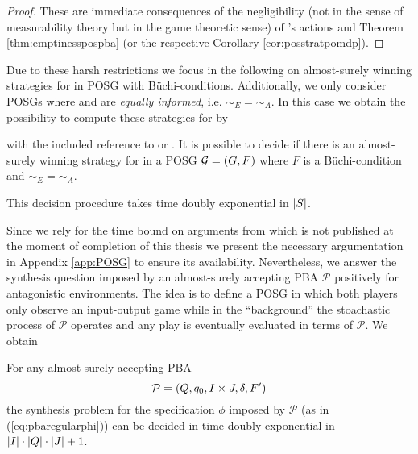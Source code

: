 \begin{proof}
  These are immediate consequences of the negligibility (not in the sense of
  measurability theory but in the game theoretic sense) of \adam{}'s actions
  and Theorem \ref{thm:emptinesspospba} (or the respective Corollary 
  \ref{cor:posstratpomdp}).
\end{proof}
Due to these harsh restrictions we focus in the following on almost-surely 
winning strategies for \eve{} in \ac{POSG} with Büchi-conditions. Additionally,
we only consider \acp{POSG} where \eve{} and \adam{} are 
\emph{equally informed}, i.e. $\sim_{E} = \sim_{A}$. In this case
we obtain the possibility to compute these strategies for \eve{} by
\begin{theorem}
  \cite[Theorem 6]{POSG} with the included reference to 
  \cite[Lemma 4]{DecProblemsForProbAuto} or \cite[Theorem 5.3]{PureStratPOSG}.
  It is possible to decide if there is an almost-surely winning strategy for 
  \eve{} in a \ac{POSG} $\mathcal{G} = \left(G, F\right)$ where $F$ is a 
  Büchi-condition and $\sim_{E} = \sim_{A}$.

  This decision procedure takes time doubly exponential in $\left\vert{S}\right\vert$.
  \label{thm:StratPOSG}
\end{theorem}
Since we rely for the time bound on arguments from \cite{PureStratPOSG} which 
is not published at the moment of completion of this thesis we present the 
necessary argumentation in Appendix \ref{app:POSG} to ensure its availability.
Nevertheless, we answer the synthesis question imposed by an almost-surely
accepting \ac{PBA} $\mathcal{P}$ positively for antagonistic environments. The 
idea is to define a \ac{POSG} in which both players only observe an 
input-output game while in the \enquote{background} the stoachastic process of
$\mathcal{P}$ operates and any play is eventually evaluated in terms of 
$\mathcal{P}$. We obtain
\begin{theorem}
  For any almost-surely accepting \ac{PBA} 
  \begin{equation*}
    \mathcal{P} = \left(Q, q_{0}, I\times J, \delta, F'\right)
  \end{equation*}
  the synthesis problem for the specification $\phi$ imposed by $\mathcal{P}$
  (as in (\ref{eq:pbaregularphi})) can be decided in time doubly exponential in 
  $\left\vert{I}\right\vert\cdot \left\vert{Q}\right\vert\cdot \left\vert{J}\right\vert + 1$.
\end{theorem}
